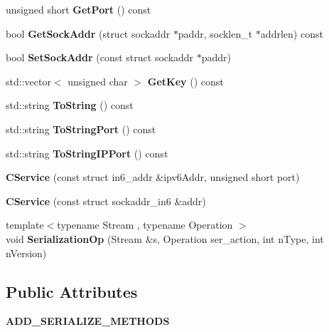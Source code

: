 \begin{DoxyCompactItemize}
\mbox{\label{class_c_service_a71caa0d6aa6ab12758bde8b6a6bcfd2a}} 
unsigned short {\bfseries Get\+Port} () const
\item 
\mbox{\label{class_c_service_ac4c6d655fab3af40937f0b0c65581745}} 
bool {\bfseries Get\+Sock\+Addr} (struct sockaddr $\ast$paddr, socklen\+\_\+t $\ast$addrlen) const
\item 
\mbox{\label{class_c_service_a77782219f5d85f326b4c089cb2636e6f}} 
bool {\bfseries Set\+Sock\+Addr} (const struct sockaddr $\ast$paddr)
\item 
\mbox{\label{class_c_service_af21ea7db4318330b337c8bfdcc55aff0}} 
std\+::vector$<$ unsigned char $>$ {\bfseries Get\+Key} () const
\item 
\mbox{\label{class_c_service_a225473158bc07c87a6a862160d73cfea}} 
std\+::string {\bfseries To\+String} () const
\item 
\mbox{\label{class_c_service_a95d6f24b6a613fca24734ba4e38ef3dc}} 
std\+::string {\bfseries To\+String\+Port} () const
\item 
\mbox{\label{class_c_service_a224204c838b12eeb49ca7eabe6f75004}} 
std\+::string {\bfseries To\+String\+I\+P\+Port} () const
\item 
\mbox{\label{class_c_service_a92fd246e176f01266cb36beae0c8f4fe}} 
{\bfseries C\+Service} (const struct in6\+\_\+addr \&ipv6\+Addr, unsigned short port)
\item 
\mbox{\label{class_c_service_ac0eb3107507be78cc683e7a7fa8d56e4}} 
{\bfseries C\+Service} (const struct sockaddr\+\_\+in6 \&addr)
\item 
\mbox{\label{class_c_service_a0673ebec7bdc8558ce3fe1d63ea4d2e1}} 
{\footnotesize template$<$typename Stream , typename Operation $>$ }\\void {\bfseries Serialization\+Op} (Stream \&s, Operation ser\+\_\+action, int n\+Type, int n\+Version)
\end{DoxyCompactItemize}
\subsection*{Public Attributes}
\begin{DoxyCompactItemize}
\item 
\mbox{\label{class_c_service_a3347aa84bd8f98ae853307ad4e47a4f5}} 
{\bfseries A\+D\+D\+\_\+\+S\+E\+R\+I\+A\+L\+I\+Z\+E\+\_\+\+M\+E\+T\+H\+O\+DS}
\end{DoxyCompactItemize}
